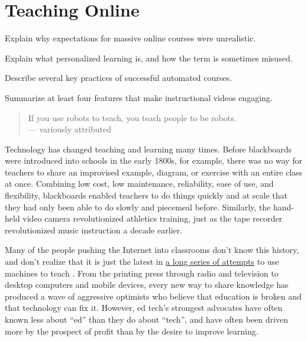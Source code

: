\chapter{Teaching Online}\label{s:online}

\begin{objectives}

\item Explain why expectations for massive online courses were
  unrealistic.

\item Explain what personalized learning is, and how the term is
  sometimes misused.

\item Describe several key practices of successful automated courses.

\item Summarize at least four features that make instructional videos
  engaging.

\end{objectives}

\begin{quote}

  If you use robots to teach, you teach people to be robots.\\
  --- variously attributed

\end{quote}

Technology has changed teaching and learning many times.  Before
blackboards were introduced into schools in the early 1800s, for
example, there was no way for teachers to share an improvised example,
diagram, or exercise with an entire class at once.  Combining low
cost, low maintenance, reliability, ease of use, and flexibility,
blackboards enabled teachers to do things quickly and at scale that
they had only been able to do slowly and piecemeal before.  Similarly,
the hand-held video camera revolutionized athletics training, just as
the tape recorder revolutionized music instruction a decade earlier.

Many of the people pushing the Internet into classrooms don't know
this history, and don't realize that it is just the latest in
\href{http://teachingmachin.es/timeline.html}{a long series of
  attempts} to use machines to teach \cite{Watt2014}.  From the
printing press through radio and television to desktop computers and
mobile devices, every new way to share knowledge has produced a wave
of aggressive optimists who believe that education is broken and that
technology can fix it.  However, ed tech's strongest advocates have
often known less about ``ed'' than they do about ``tech'', and have
often been driven more by the prospect of profit than by the desire to
improve learning.


